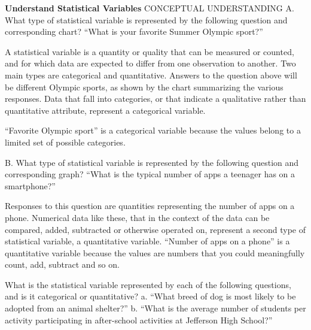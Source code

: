 \documentclass{article}
\newenvironment{example}[1]{}{}         %
\newenvironment{tryit}[1]{}{}           %
\newcommand{\answer}[1]{}               %
\newcommand{\placeholder}[2]{}          %
\newcommand{\te}[1]{}                   %
\begin{document}
\begin{example}{2}
\textbf{Understand Statistical Variables}
CONCEPTUAL UNDERSTANDING
A. What type of statistical variable is represented by the following question and corresponding chart?
``What is your favorite Summer Olympic sport?''
\placeholder{illustration}{Television showing four illustrated sports: Track \& Field 25\%, Basketball 25\%, Swimming 20\%, Gymnastics 30\%.}
A statistical variable is a quantity or quality that can be measured or counted, and for which data are expected to differ from one observation to another. Two main types are categorical and quantitative.
Answers to the question above will be different Olympic sports, as shown by the chart summarizing the various responses. Data that fall into categories, or that indicate a qualitative rather than quantitative attribute, represent a categorical variable.
\te{COMMUNICATE PRECISELY Variables in mathematics can be used to represent an unknown number, such as the price of a shirt at a store. Statistical variables represent a quantity that varies between observations, such as the price of the shirt at every store in the country.}
``Favorite Olympic sport'' is a categorical variable because the values belong to a limited set of possible categories.
\answer{A. categorical variable}
B. What type of statistical variable is represented by the following question and corresponding graph?
``What is the typical number of apps a teenager has on a smartphone?''
\placeholder{graph}{Teen Smart Phones red histogram on a green smartphone. Horizontal Estimated Number of Apps, 35 through 60 every 5; vertical labels 10,20,30, no axis title, baseline zero with a break at the horizontal start. Bars 35--40:10, 40--45:20, 45--50:30, 50--55:15, 55--60:15.}
Responses to this question are quantities representing the number of apps on a phone. Numerical data like these, that in the context of the data can be compared, added, subtracted or otherwise operated on, represent a second type of statistical variable, a quantitative variable. ``Number of apps on a phone'' is a quantitative variable because the values are numbers that you could meaningfully count, add, subtract and so on.
\answer{B. quantitative variable}
\te{STUDY TIP Some variables, such as month or semester grade, can be categorical or quantitative depending on the context.}
\end{example}
\begin{tryit}{2}
What is the statistical variable represented by each of the following questions, and is it categorical or quantitative?
a. ``What breed of dog is most likely to be adopted from an animal shelter?''
b. ``What is the average number of students per activity participating in after-school activities at Jefferson High School?''
\answer{a. breed of dog; categorical; b. average number of students; quantitative}
\end{tryit}
\end{document}
